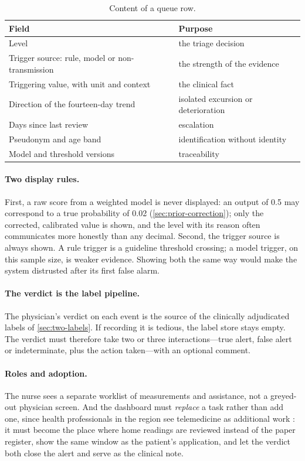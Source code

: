 \begin{table}[htbp]
\centering\small
\caption{Content of a queue row.}\label{tab:queue-row}
\begin{tabularx}{\textwidth}{@{}>{\raggedright\arraybackslash}p{6.0cm} X@{}}
\toprule
\textbf{Field} & \textbf{Purpose} \\
\midrule
Level & the triage decision \\
Trigger source: rule, model or non-transmission & the strength of the evidence \\
Triggering value, with unit and context & the clinical fact \\
Direction of the fourteen-day trend & isolated excursion or deterioration \\
Days since last review & escalation \\
Pseudonym and age band & identification without identity \\
Model and threshold versions & traceability \\
\bottomrule
\end{tabularx}
\end{table}

\paragraph{Two display rules.} First, a raw score from a weighted model is never displayed: an output of 0.5 may correspond to a true probability of 0.02 (\cref{sec:prior-correction}); only the corrected, calibrated value is shown, and the level with its reason often communicates more honestly than any decimal. Second, the trigger source is always shown. A rule trigger is a guideline threshold crossing; a model trigger, on this sample size, is weaker evidence. Showing both the same way would make the system distrusted after its first false alarm.

\paragraph{The verdict is the label pipeline.} The physician's verdict on each event is the source of the clinically adjudicated labels of \cref{sec:two-labels}. If recording it is tedious, the label store stays empty. The verdict must therefore take two or three interactions---true alert, false alert or indeterminate, plus the action taken---with an optional comment.

\paragraph{Roles and adoption.} The nurse sees a separate worklist of measurements and assistance, not a greyed-out physician screen. And the dashboard must \emph{replace} a task rather than add one, since health professionals in the region see telemedicine as additional work \parencite{dodoo2022}: it must become the place where home readings are reviewed instead of the paper register, show the same window as the patient's application, and let the verdict both close the alert and serve as the clinical note.

